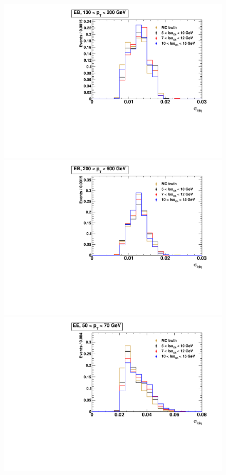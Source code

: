 \begin{figure}[!htbp]
\begin{multicols}{2}
		\includegraphics[scale=0.29]{figures/closure_test_fake_template_sieie_EB_pt130To200_sample_all.pdf} \\
		\includegraphics[scale=0.29]{figures/closure_test_fake_template_sieie_EB_pt200To600_sample_all.pdf} \\
		\includegraphics[scale=0.29]{figures/closure_test_fake_template_sieie_EE_pt50To70_sample_all.pdf} \\

\end{multicols}
\end{figure}
